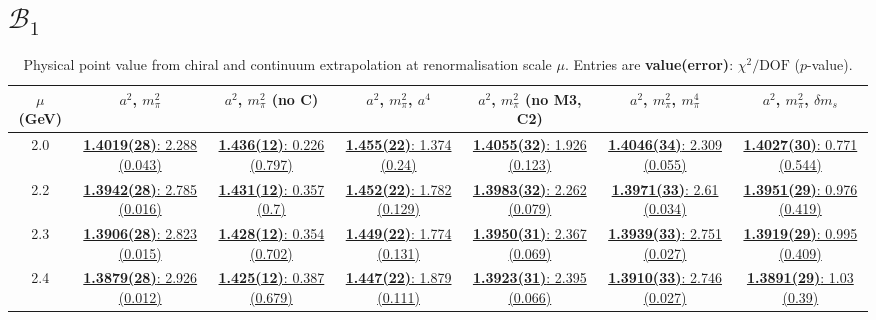 \documentclass[12pt]{extarticle}
\begin{document}
\section{$\mathcal{B}_1$}
\begin{table}[h!]
\begin{center}
\begin{tabular}{|c|c|c|c|c|c|c|}
\hline
$\mu$ (GeV) & $a^2$, $m_\pi^2$& $a^2$, $m_\pi^2$ (no C)& $a^2$, $m_\pi^2$, $a^4$& $a^2$, $m_\pi^2$ (no M3, C2)& $a^2$, $m_\pi^2$, $m_\pi^4$& $a^2$, $m_\pi^2$, $\delta m_s$\\
\hline
2.0& \hyperlink{VVpAA/NPR/bag_a2m2_20.pdf.1}{\textbf{1.4019(28)}: 2.288 (0.043)} & \hyperlink{VVpAA/NPR/bag_a2m2noC_20.pdf.1}{\textbf{1.436(12)}: 0.226 (0.797)} & \hyperlink{VVpAA/NPR/bag_a2a4m2_20.pdf.1}{\textbf{1.455(22)}: 1.374 (0.24)} & \hyperlink{VVpAA/NPR/bag_a2m2mcut_20.pdf.1}{\textbf{1.4055(32)}: 1.926 (0.123)} & \hyperlink{VVpAA/NPR/bag_a2m2m4_20.pdf.1}{\textbf{1.4046(34)}: 2.309 (0.055)} & \hyperlink{VVpAA/NPR/bag_a2m2delm_20.pdf.1}{\textbf{1.4027(30)}: 0.771 (0.544)}\\
2.2& \hyperlink{VVpAA/NPR/bag_a2m2_22.pdf.1}{\textbf{1.3942(28)}: 2.785 (0.016)} & \hyperlink{VVpAA/NPR/bag_a2m2noC_22.pdf.1}{\textbf{1.431(12)}: 0.357 (0.7)} & \hyperlink{VVpAA/NPR/bag_a2a4m2_22.pdf.1}{\textbf{1.452(22)}: 1.782 (0.129)} & \hyperlink{VVpAA/NPR/bag_a2m2mcut_22.pdf.1}{\textbf{1.3983(32)}: 2.262 (0.079)} & \hyperlink{VVpAA/NPR/bag_a2m2m4_22.pdf.1}{\textbf{1.3971(33)}: 2.61 (0.034)} & \hyperlink{VVpAA/NPR/bag_a2m2delm_22.pdf.1}{\textbf{1.3951(29)}: 0.976 (0.419)}\\
2.3& \hyperlink{VVpAA/NPR/bag_a2m2_23.pdf.1}{\textbf{1.3906(28)}: 2.823 (0.015)} & \hyperlink{VVpAA/NPR/bag_a2m2noC_23.pdf.1}{\textbf{1.428(12)}: 0.354 (0.702)} & \hyperlink{VVpAA/NPR/bag_a2a4m2_23.pdf.1}{\textbf{1.449(22)}: 1.774 (0.131)} & \hyperlink{VVpAA/NPR/bag_a2m2mcut_23.pdf.1}{\textbf{1.3950(31)}: 2.367 (0.069)} & \hyperlink{VVpAA/NPR/bag_a2m2m4_23.pdf.1}{\textbf{1.3939(33)}: 2.751 (0.027)} & \hyperlink{VVpAA/NPR/bag_a2m2delm_23.pdf.1}{\textbf{1.3919(29)}: 0.995 (0.409)}\\
2.4& \hyperlink{VVpAA/NPR/bag_a2m2_24.pdf.1}{\textbf{1.3879(28)}: 2.926 (0.012)} & \hyperlink{VVpAA/NPR/bag_a2m2noC_24.pdf.1}{\textbf{1.425(12)}: 0.387 (0.679)} & \hyperlink{VVpAA/NPR/bag_a2a4m2_24.pdf.1}{\textbf{1.447(22)}: 1.879 (0.111)} & \hyperlink{VVpAA/NPR/bag_a2m2mcut_24.pdf.1}{\textbf{1.3923(31)}: 2.395 (0.066)} & \hyperlink{VVpAA/NPR/bag_a2m2m4_24.pdf.1}{\textbf{1.3910(33)}: 2.746 (0.027)} & \hyperlink{VVpAA/NPR/bag_a2m2delm_24.pdf.1}{\textbf{1.3891(29)}: 1.03 (0.39)}\\
\hline
\end{tabular}
\caption{Physical point value from chiral and continuum extrapolation at renormalisation scale $\mu$. Entries are \textbf{value(error)}: $\chi^2/\text{DOF}$ ($p$-value).}
\end{center}
\end{table}
\end{document}

